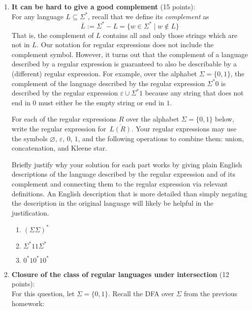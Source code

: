\begin{enumerate} 


\item \textbf{It can be hard to give a good complement} (15 points): \\
For any language $L \subseteq \Sigma^*$, recall that we define its \emph{complement} as 
$$\overline{L} := \Sigma^* - L = \{w \in \Sigma^* \mid w \notin L\}$$ That is, the complement of $L$ 
contains all and only those strings which are not in $L$. Our notation for regular expressions does not 
include the complement symbol. However, 
it turns out that the complement of a language described by a regular expression is guaranteed to also be describable by a 
(different) regular expression. For example, over the alphabet $\Sigma = \{0,1\}$, the complement of the language described 
by the regular expression $\Sigma^* 0$ is described by the regular expression $\varepsilon \cup \Sigma^*1$
because any string that does not end in $0$
must either be the empty string or end in $1$.

For each of the regular expressions $R$ over the alphabet $\Sigma = \{0,1\}$ below, write the regular 
expression for~$\overline{L(R)}$. Your regular expressions may use the symbols
$\varnothing$, $\varepsilon$, $0$, $1$, and the 
following operations to combine them: union, concatenation, 
and Kleene star.

Briefly justify why your solution for each part works by giving plain English descriptions of the language 
described by the regular expression and of its complement and connecting them to the regular 
expression via relevant definitions. An English description that is more 
detailed than simply negating the description in the original language will likely be helpful in the justification.

\begin{enumerate}
    \item\gradeCorrectFirst $(\Sigma \Sigma)^*$
    \item\gradeCorrect $\Sigma^* 11 \Sigma^*$
    \item\gradeCorrect $0^* 1 0^* 1 0^*$
\end{enumerate}


\item \textbf{Closure of the class of regular languages under intersection} (12 points): \\
For this question, let $\Sigma = \{0,1\}$.
Recall the DFA over $\Sigma$ from the previous homework:
\begin{center}
\end{center}
\end{enumerate}
